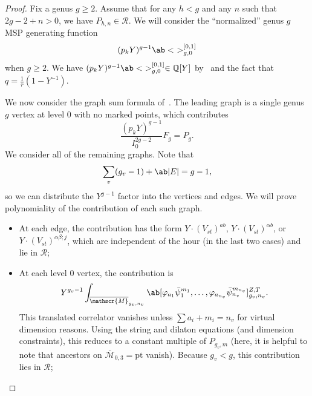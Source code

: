 \documentclass[10pt]{amsart}
\theoremstyle{definition}
\theoremstyle{remark}
\theoremstyle{plain}
\theoremstyle{definition}
\theoremstyle{remark}
\newcommand{\Q}{\mathbb{Q}}
\newcommand{\msc}[1]{\mathscr{#1}}
\newcommand{\mr}[1]{\mathrm{#1}}
\newcommand{\ol}[1]{\overline{#1}}
\newcommand{\1}{\mathbf{1}}
\newcommand{\2}{\mathbf{2}}
\newcommand{\3}{\mathbf{3}}
\newcommand{\pt}{\mr{pt}}
\numberwithin{equation}{section}
\begin{document}
\begin{proof}
    Fix a genus $g \geq 2$. Assume that for any $h < g$ and any $n$ such that $2g-2+n > 0$, we have $P_{h,n} \in \msc{R}$. We will consider the ``normalized'' genus $g$ MSP generating function
    \[ (p_k Y )^{g-1} \ab<\ >_{g,0}^{[0,1]} \]
    when $g \geq 2$. We have $(p_k Y)^{g-1} \ab<\ >_{g,0}^{[0,1]} \in \Q[Y]$ by~ and the fact that $q = \frac{1}{r}(1-Y^{-1})$.

    We now consider the graph sum formula of~. The leading graph is a single genus $g$ vertex at level $0$ with no marked points, which contributes
    \[ \frac{(p_k Y)^{g-1}}{I_0^{2g-2}} F_g = P_g. \]
    We consider all of the remaining graphs. Note that
    \[ \sum_v (g_v-1) + \ab|E| = g-1, \]
    so we can distribute the $Y^{g-1}$ factor into the vertices and edges. We will prove polynomiality of the contribution of each such graph.
    \begin{itemize}
        \item At each edge, the contribution has the form $Y \cdot ( V_{st} )^{ab}$, $Y \cdot ( V_{st} )^{\alpha b}$, or $Y \cdot ( V_{st} )^{\alpha\beta; j}$, which are independent of the hour (in the last two cases) and lie in $\msc{R}$;
        \item At each level $0$ vertex, the contribution is 
            \[ Y^{g_v-1} \int_{\ol{\msc{M}}_{g_v, n_v}} \ab[\varphi_{a_1}\bar{\psi}_1^{m_1}, \ldots, \varphi_{a_{n_v}} \bar{\psi}_{n_v}^{m_{n_v}}]_{g_v, n_v}^{Z, T}. \]
            This translated correlator vanishes unless $\sum a_i + m_i = n_v$ for virtual dimension reasons. Using the string and dilaton equations (and dimension constraints), this reduces to a constant multiple of $P_{g_v, m}$ (here, it is helpful to note that ancestors on $\ol{\msc{M}}_{0,3} = \pt$ vanish). Because $g_v < g$, this contribution lies in $\msc{R}$;


\end{itemize}
\end{proof}
\end{document}
